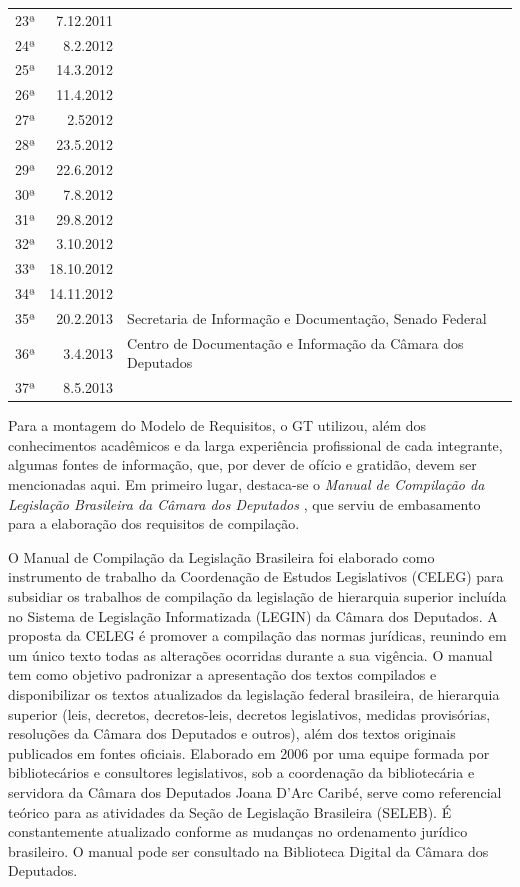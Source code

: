 \documentclass[a4paper,11pt,openright,twoside,english,brazil]{abntex2}
\begin{document}
\begin{table}[htb]
\begin{tabular}{c|r|p{10.0cm}}
    23ª & 7.12.2011
    \\ \cline{1-2}
    24ª & 8.2.2012
    \\ \cline{1-2}
    25ª & 14.3.2012
    \\ \cline{1-2}
    26ª & 11.4.2012
    \\ \cline{1-2}
    27ª & 2.52012
    \\ \cline{1-2}
    28ª & 23.5.2012
    \\ \cline{1-2}
    29ª & 22.6.2012
    \\ \cline{1-2}
    30ª & 7.8.2012
    \\ \cline{1-2}
    31ª & 29.8.2012
    \\ \cline{1-2}
    32ª & 3.10.2012
    \\ \cline{1-2}
    33ª & 18.10.2012
    \\ \cline{1-2}
    34ª & 14.11.2012
    \\ \hline
    35ª & 20.2.2013 & Secretaria de Informação e Documentação, Senado Federal
    \\ \hline
    36ª & 3.4.2013 & \multirow{1}{*}{Centro de Documentação e Informação da
    Câmara dos Deputados}
    \\ \cline{1-2}
    37ª & 8.5.2013
    \\ \hline
    \hline
\end{tabular}
\end{table}

Para a montagem do Modelo de Requisitos, o GT utilizou, além dos conhecimentos
acadêmicos e da larga experiência profissional de cada integrante, algumas
fontes de informação, que, por dever de ofício e gratidão, devem ser mencionadas
aqui. Em primeiro lugar, destaca-se o \emph{Manual de Compilação da Legislação
Brasileira da Câmara dos Deputados} \cite{cd2012}, que serviu de embasamento
para a elaboração dos requisitos de compilação.

O Manual de Compilação da Legislação Brasileira foi elaborado como instrumento
de trabalho da Coordenação de Estudos Legislativos (CELEG) para subsidiar os
trabalhos de compilação da legislação de hierarquia superior incluída no Sistema
de Legislação Informatizada (LEGIN) da Câmara dos Deputados. A proposta da CELEG
é promover a compilação das normas jurídicas, reunindo em um único texto todas
as alterações ocorridas durante a sua vigência. O manual tem como objetivo
padronizar a apresentação dos textos compilados e disponibilizar os textos
atualizados da legislação federal brasileira, de hierarquia superior (leis,
decretos, decretos-leis, decretos legislativos, medidas provisórias, resoluções
da Câmara dos Deputados e outros), além dos textos originais publicados em
fontes oficiais. Elaborado em 2006 por uma equipe formada por bibliotecários e
consultores legislativos, sob a coordenação da bibliotecária e servidora da
Câmara dos Deputados Joana D’Arc Caribé, serve como referencial teórico para as
atividades da Seção de Legislação Brasileira (SELEB). É constantemente
atualizado conforme as mudanças no ordenamento jurídico brasileiro. O manual
pode ser consultado na Biblioteca Digital da Câmara dos Deputados.
\end{document}
